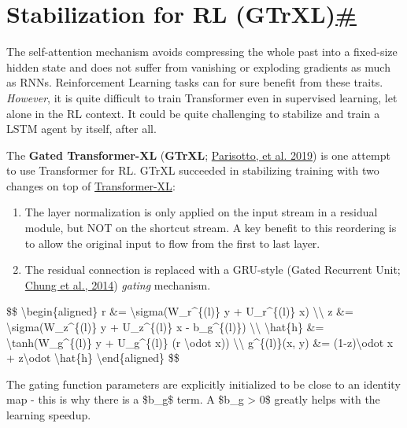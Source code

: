 \section{\texorpdfstring{Stabilization for RL (GTrXL)\hyperref[stabilization-for-rl-gtrxl]{\#}}{Stabilization for RL (GTrXL)\#}}\label{stabilization-for-rl-gtrxl}

The self-attention mechanism avoids compressing the whole past into a fixed-size hidden state and does not suffer from vanishing or exploding gradients as much as RNNs. Reinforcement Learning tasks can for sure benefit from these traits. \emph{However}, it is quite difficult to train Transformer even in supervised learning, let alone in the RL context. It could be quite challenging to stabilize and train a LSTM agent by itself, after all.

The \textbf{Gated Transformer-XL} (\textbf{GTrXL}; \href{https://arxiv.org/abs/1910.06764}{Parisotto, et al. 2019}) is one attempt to use Transformer for RL. GTrXL succeeded in stabilizing training with two changes on top of \hyperref[longer-attention-span-transformer-xl]{Transformer-XL}:

\begin{enumerate}
\tightlist
\item
  The layer normalization is only applied on the input stream in a residual module, but NOT on the shortcut stream. A key benefit to this reordering is to allow the original input to flow from the first to last layer.
\item
  The residual connection is replaced with a GRU-style (Gated Recurrent Unit; \href{https://arxiv.org/abs/1412.3555}{Chung et al., 2014}) \emph{gating} mechanism.
\end{enumerate}

\$\$ \textbackslash begin\{aligned\} r \&= \textbackslash sigma(W\_r\^{}\{(l)\} y + U\_r\^{}\{(l)\} x) \textbackslash\textbackslash{} z \&= \textbackslash sigma(W\_z\^{}\{(l)\} y + U\_z\^{}\{(l)\} x - b\_g\^{}\{(l)\}) \textbackslash\textbackslash{} \textbackslash hat\{h\} \&= \textbackslash tanh(W\_g\^{}\{(l)\} y + U\_g\^{}\{(l)\} (r \textbackslash odot x)) \textbackslash\textbackslash{} g\^{}\{(l)\}(x, y) \&= (1-z)\textbackslash odot x + z\textbackslash odot \textbackslash hat\{h\} \textbackslash end\{aligned\} \$\$

The gating function parameters are explicitly initialized to be close to an identity map - this is why there is a \$b\_g\$ term. A \$b\_g \textgreater{} 0\$ greatly helps with the learning speedup.

